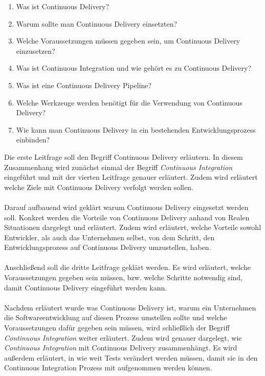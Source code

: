 \begin{enumerate}
	\item Was ist Continuous Delivery?
	\item Warum sollte man Continuous Delivery einsetzten?
	\item Welche Voraussetzungen müssen gegeben sein, um Continuous Delivery einzusetzen?
	\item Was ist Continuous Integration und wie gehört es zu Continuous Delivery?
    \item Was ist eine Continuous Delivery Pipeline?
    \item Welche Werkzeuge werden benötigt für die Verwendung von Continuous Delivery?
	\item Wie kann man Continuous Delivery in ein bestehenden Entwicklungsprozess einbinden?
\end{enumerate}
Die erste Leitfrage soll den Begriff Continuous Delivery erläutern. In diesem Zusammenhang wird zunächst einmal der Begriff \textit{Continuous Integration} eingeführt und mit der vierten Leitfrage genauer erläutert. Zudem wird erläutert welche Ziele mit Continuous Delivery verfolgt werden sollen.\\\\
Darauf aufbauend wird geklärt warum Continuous Delivery eingesetzt werden soll. Konkret werden die Vorteile von Continuous Delivery anhand von Realen Situationen dargelegt und erläutert. Zudem wird erläutert, welche Vorteile sowohl Entwickler, als auch das Unternehmen selbst, von dem Schritt, den Entwicklungsprozess auf Continuous Delivery umzustellen, haben.\\\\
Anschließend soll die dritte Leitfrage geklärt werden. Es wird erläutert, welche Voraussetzungen gegeben sein müssen, bzw. welche Schritte notwendig sind, damit Continuous Delivery eingeführt werden kann.\\\\
Nachdem erläutert wurde was Continuous Delivery ist, warum ein Unternehmen die Softwareentwicklung auf diesen Prozess umstellen sollte und welche Voraussetzungen dafür gegeben sein müssen, wird schließlich der Begriff \textit{Continuous Integration} weiter erläutert. Zudem wird genauer dargelegt, wie \textit{Continuous Integration} mit Continuous Delivery zusammenhängt. Es wird außerdem erläutert, in wie weit Tests verändert werden müssen, damit sie in den Continuous Integration Prozess mit aufgenommen werden können.\\\\
